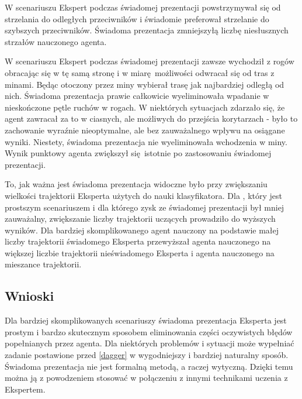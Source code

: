 W scenariuszu  Ekspert podczas świadomej prezentacji powstrzymywał się od strzelania do odległych przeciwników i świadomie preferował strzelanie do szybszych przeciwników. Świadoma prezentacja zmniejszyłą liczbę niesłusznych strzałów nauczonego agenta.

W scenariuszu  Ekspert podczas świadomej prezentacji zawsze wychodził z rogów obracając się w tę samą stronę i w miarę możliwości odwracał się od tras z minami. Będąc otoczony przez miny wybierał trasę jak najbardziej odległą od nich. Świadoma prezentacja prawie całkowicie wyeliminowała wpadanie w nieskończone pętle ruchów w rogach. W niektórych sytuacjach zdarzało się, że agent zawracał za to w ciasnych, ale możliwych do przejścia korytarzach - było to zachowanie wyraźnie nieoptymalne, ale bez zauważalnego wpływu na osiągane wyniki. Niestety, świadoma prezentacja nie wyeliminowała wchodzenia w miny. Wynik punktowy agenta zwiększył się istotnie po zastosowaniu świadomej prezentacji.

To, jak ważna jest świadoma prezentacja widoczne było przy zwiększaniu wielkości trajektorii Eksperta użytych do nauki klasyfikatora. Dla , który jest prostszym scenariuszem i dla którego zysk ze świadomej prezentacji był mniej zauważalny, zwiększanie liczby trajektorii uczących prowadziło do wyższych wyników. Dla bardziej skomplikowanego  agent nauczony na podstawie małej liczby trajektorii świadomego Eksperta przewyższał agenta nauczonego na większej liczbie trajektorii nieświadomego Eksperta i agenta nauczonego na mieszance trajektorii. 
 
\subsection{Wnioski}

Dla bardziej skomplikowanych scenariuszy świadoma prezentacja Eksperta jest prostym i bardzo skutecznym sposobem eliminowania części oczywistych błędów popełnianych przez agenta. Dla niektórych problemów i sytuacji może wypełniać zadanie postawione przed \ref{dagger} w wygodniejszy i bardziej naturalny sposób.
Świadoma prezentacja nie jest formalną metodą, a raczej wytyczną. Dzięki temu można ją z powodzeniem stosować w połączeniu z innymi technikami uczenia z Ekspertem.
